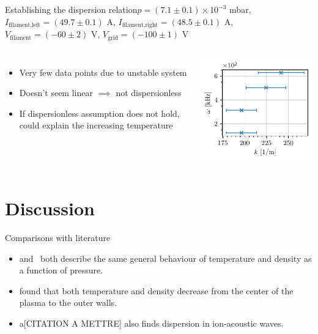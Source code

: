 \documentclass[10pt]{beamer}
\begin{document}
\begin{frame}{Establishing the dispersion relation}{$p = (7.1 \pm 0.1) \times 10^{-3}$ mbar, $I_\text{filament,left} = (49.7 \pm 0.1)$ A, $I_\text{filament,right} = (48.5 \pm 0.1)$ A, $V_\text{filament} = (-60 \pm 2)$ V, $V_\text{grid} = (-100 \pm 1)$ V}
    \begin{columns}
        \centering
        \vspace{-1cm}
        \begin{itemize}
            \item Very few data points due to unstable system
            \item Doesn't seem linear $\implies$ not dispersionless
            \item If dispersionless assumption does not hold, could explain the increasing temperature
        \end{itemize}
        
        \centering
        \includegraphics[scale=1]{../figures/dispersion_relation.pdf}
    \end{columns}
\end{frame}

\section{Discussion}
\begin{frame}{Comparisons with literature}
    \begin{itemize}
        \item {} and \,  both describe the same general behaviour of temperature and density as a function of pressure.
        \item {} found that both temperature and density decrease from the center of the plasma to the outer walls.
        \item a[CITATION A METTRE] also finds dispersion in ion-acoustic waves.
    \end{itemize}
\end{frame}
\end{document}

